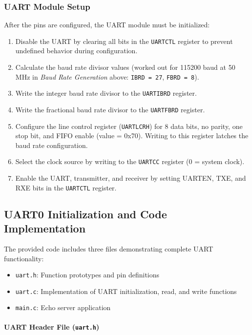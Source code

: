 \subsubsection{UART Module Setup}

After the pins are configured, the UART module must be initialized:

\begin{enumerate}[nosep]
\item Disable the UART by clearing all bits in the \texttt{UARTCTL} register to prevent undefined behavior during configuration.
\item Calculate the baud rate divisor values (worked out for 115200 baud at 50 MHz in \textit{Baud Rate Generation} above: \texttt{IBRD = 27}, \texttt{FBRD = 8}).
\item Write the integer baud rate divisor to the \texttt{UARTIBRD} register.
\item Write the fractional baud rate divisor to the \texttt{UARTFBRD} register.
\item Configure the line control register (\texttt{UARTLCRH}) for 8 data bits, no parity, one stop bit, and FIFO enable (value = 0x70). Writing to this register latches the baud rate configuration.
\item Select the clock source by writing to the \texttt{UARTCC} register (0 = system clock).
\item Enable the UART, transmitter, and receiver by setting UARTEN, TXE, and RXE bits in the \texttt{UARTCTL} register.
\end{enumerate}

\newpage
\subsection{UART0 Initialization and Code Implementation}

The provided code includes three files demonstrating complete UART functionality:

\begin{itemize}[nosep]
  \item \texttt{uart.h}: Function prototypes and pin definitions
  \item \texttt{uart.c}: Implementation of UART initialization, read, and write functions
  \item \texttt{main.c}: Echo server application
\end{itemize}
\pagestyle{empty} %
\smallskip
\paragraph{UART Header File (\texttt{uart.h})} \hfill

